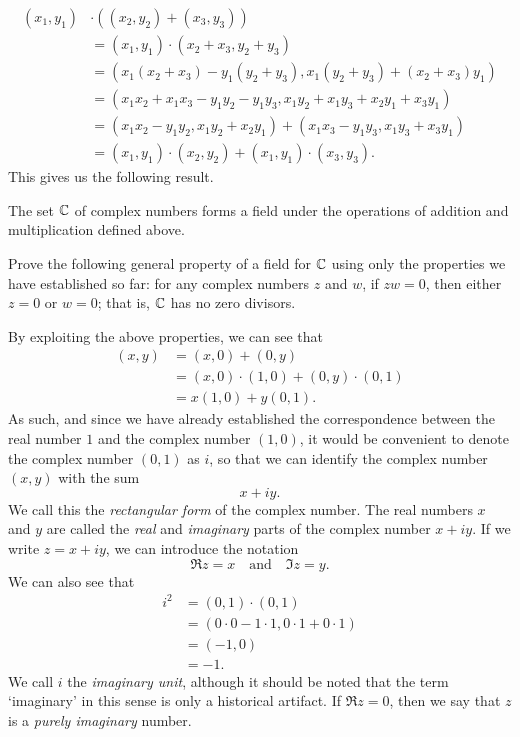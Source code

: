 \[
    \begin{aligned}
        (x_1, y_1) &\cdot \left((x_2, y_2) + (x_3, y_3)\right)\\
        &= (x_1, y_1) \cdot (x_2 + x_3, y_2 + y_3) \\
        &= (x_1(x_2 + x_3) - y_1(y_2 + y_3), x_1(y_2 + y_3) + (x_2 + x_3)y_1) \\
        &= (x_1x_2 + x_1x_3 - y_1y_2 - y_1y_3, x_1y_2 + x_1y_3 + x_2y_1 + x_3y_1) \\
        &= (x_1x_2 - y_1y_2, x_1y_2 + x_2y_1) + (x_1x_3 - y_1y_3, x_1y_3 + x_3y_1) \\
        &= (x_1, y_1) \cdot (x_2, y_2) + (x_1, y_1) \cdot (x_3, y_3).
    \end{aligned}
\]
This gives us the following result.
\begin{theorem}[\(\C\) is a field]
    The set \(\C\) of complex numbers forms a field under the operations of addition and multiplication defined above.
    \label{thm:c-field}
\end{theorem}

\begin{example}
    Prove the following general property of a field for \(\C\) using only the properties we have established so far: for any complex numbers \(z\) and \(w\), if \(zw = 0\), then either \(z = 0\) or \(w = 0\); that is, \(\C\) has no zero divisors.
\end{example}

By exploiting the above properties, we can see that
\begin{align}
    (x, y) &= (x, 0) + (0, y)\label{eq:rectangular} \\
    &= (x, 0) \cdot (1, 0) + (0, y) \cdot (0, 1) \nonumber \\
    &= x(1, 0) + y(0, 1).\nonumber
\end{align}
As such, and since we have already established the correspondence between the real number \(1\) and the complex number \((1, 0)\), it would be convenient to denote the complex number \((0, 1)\) as \(i\), so that we can identify the complex number \((x, y)\) with the sum \[x + iy.\] We call this the \emph{rectangular form} of the complex number. The real numbers \(x\) and \(y\) are called the \emph{real} and \emph{imaginary} parts of the complex number \(x + iy\). If we write \(z = x + iy\), we can introduce the notation
\[
    \Re z = x \quad \text{and} \quad \Im z = y.
\]
We can also see that
\[
    \begin{aligned}
        i^2 &= (0, 1) \cdot (0, 1) \\
        &= (0 \cdot 0 - 1 \cdot 1, 0 \cdot 1 + 0 \cdot 1) \\
        &= (-1, 0) \\
        &= -1.
    \end{aligned}
\]
We call \(i\) the \emph{imaginary unit}, although it should be noted that the term `imaginary' in this sense is only a historical artifact. If \(\Re z = 0\), then we say that \(z\) is a \emph{purely imaginary} number.

